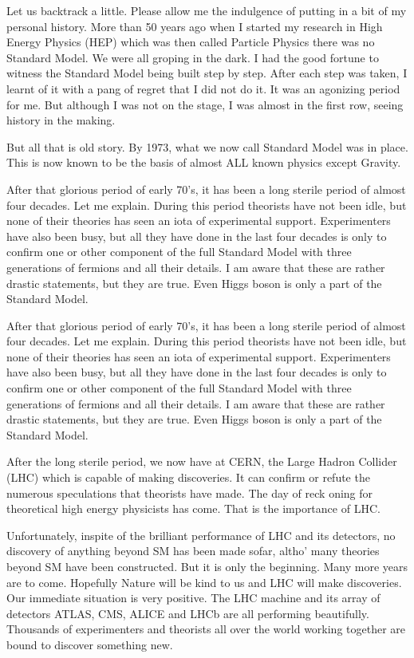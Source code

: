 Let us backtrack a little. Please allow me the indulgence of putting in a
bit of my personal history. More than 50 years ago when I started my research
in High Energy Physics (HEP) which was then called Particle Physics there
was no Standard Model. We were all groping in the dark. I had the good
fortune to witness the Standard Model being built step by step. After each
step was taken, I learnt of it with a pang of regret that I did not do it. It
was an agonizing period for me. But although I was not on the stage, I was
almost in the first row, seeing history in the making. 

But all that is old story. By 1973, what we now call Standard Model was
in place. This is now known to be the basis of almost ALL known physics
except Gravity. 

After that glorious period of early 70's, it has been a long sterile period of
almost four decades. Let me explain. During this period theorists have not
been idle, but none of their theories has seen an iota of experimental support.
Experimenters have also been busy, but all they have done in the last four
decades is only to confirm one or other component of the full Standard Model
with three generations of fermions and all their details. I am aware that these
are rather drastic statements, but they are true. Even Higgs boson is only a
part of the Standard Model. 

After that glorious period of early 70's, it has been a long sterile period of
almost four decades. Let me explain. During this period theorists have not
been idle, but none of their theories has seen an iota of experimental support.
Experimenters have also been busy, but all they have done in the last four
decades is only to confirm one or other component of the full Standard Model
with three generations of fermions and all their details. I am aware that these
are rather drastic statements, but they are true. Even Higgs boson is only a
part of the Standard Model. 

After the long sterile period, we now have at CERN, the Large Hadron
Collider (LHC) which is capable of making discoveries. It can confirm or
refute the numerous speculations that theorists have made. The day of reck oning for theoretical high energy physicists has come. That is the importance
of LHC. 


Unfortunately, inspite of the brilliant performance of LHC and its detectors, no discovery of anything beyond SM has been made sofar, altho’ many
theories beyond SM have been constructed. But it is only the beginning.
Many more years are to come. Hopefully Nature will be kind to us and LHC
will make discoveries. Our immediate situation is very positive. The LHC
machine and its array of detectors ATLAS, CMS, ALICE and LHCb are all
performing beautifully. Thousands of experimenters and theorists all over
the world working together are bound to discover something new. 



